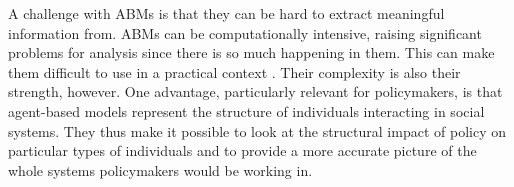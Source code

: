 A challenge with ABMs is that they can be hard to extract meaningful information from. ABMs can be computationally intensive, raising significant problems for analysis since there is so much happening in them. This can make them difficult to use in a practical context \cite{banksStatisticalChallengesAgentBased2021}. %
% 
Their complexity is also their strength, however. 
One advantage, particularly relevant for policymakers, is that agent-based models represent the structure of individuals interacting in social systems. %
They thus make it possible to look at the structural impact of policy on particular types of individuals and to provide a more accurate picture of the whole systems policymakers would be working in.




%
%
%
%
%
%

